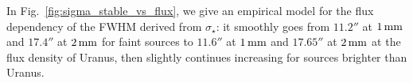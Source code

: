 In Fig.~\ref{fig:sigma_stable_vs_flux}, we give an
empirical model for the flux dependency of the FWHM derived from
$\sigma_{\star}$: it
smoothly goes from $11.2''$ at $1\,\rm{mm}$ and $17.4''$ at $2\,\rm{mm}$ for
faint sources to $11.6''$ at $1\,\rm{mm}$ and $17.65''$ at
$2\,\rm{mm}$ at the flux density of Uranus,
then slightly continues increasing for sources brighter than Uranus.
